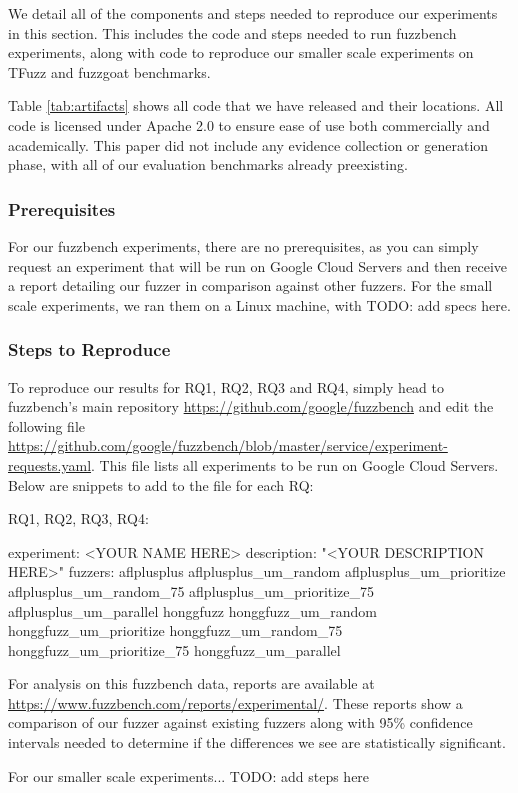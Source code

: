 \documentclass[manuscript,screen,review]{acmart}
\begin{document}
We detail all of the components and steps needed to reproduce our experiments in this section. This includes the code and steps needed to run fuzzbench experiments, along with code to reproduce our smaller
scale experiments on TFuzz and fuzzgoat benchmarks. 

Table \ref{tab:artifacts} shows all code that we have released and their locations. All code is licensed under Apache 2.0 to ensure ease of use both commercially and academically. This paper
did not include any evidence collection or generation phase, with all of our evaluation benchmarks already preexisting.

\subsubsection{Prerequisites}
For our fuzzbench experiments, there are no prerequisites, as you can simply request an experiment that will be run on Google Cloud Servers and then receive a report detailing our fuzzer in comparison
against other fuzzers. For the small scale experiments, we ran them on a Linux machine, with TODO: add specs here.

\subsubsection{Steps to Reproduce}
To reproduce our results for RQ1, RQ2, RQ3 and RQ4, simply head to fuzzbench's main repository \url{https://github.com/google/fuzzbench} and edit the following file 
\url{https://github.com/google/fuzzbench/blob/master/service/experiment-requests.yaml}. This file lists all experiments to be run on Google Cloud Servers. Below are snippets to
add to the file for each RQ:

RQ1, RQ2, RQ3, RQ4:
\begin{code}
\- experiment: <YOUR NAME HERE>
    description: "<YOUR DESCRIPTION HERE>"
    fuzzers:
      \- aflplusplus
      \- aflplusplus\_um\_random
      \- aflplusplus\_um\_prioritize
      \- aflplusplus\_um\_random\_75
      \- aflplusplus\_um\_prioritize\_75
      \- aflplusplus\_um\_parallel
      \- honggfuzz
      \- honggfuzz\_um\_random
      \- honggfuzz\_um\_prioritize
      \- honggfuzz\_um\_random\_75
      \- honggfuzz\_um\_prioritize\_75
      \- honggfuzz\_um\_parallel
\end{code}

For analysis on this fuzzbench data, reports are available at \url{https://www.fuzzbench.com/reports/experimental/}. These reports show a comparison of our fuzzer against existing 
fuzzers along with 95\% confidence intervals needed to determine if the differences we see are statistically significant.

For our smaller scale experiments... TODO: add steps here
\end{document}
